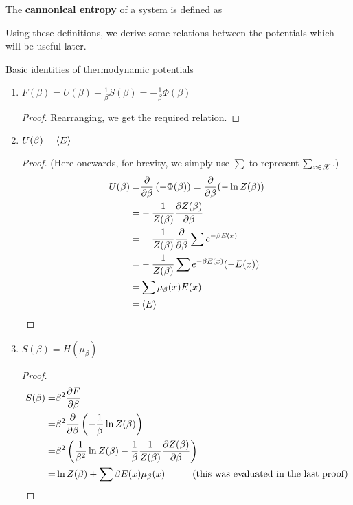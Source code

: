 \documentclass[letterpaper,english,10pt]{article}
\begin{document}
\begin{defn}
The \textbf{cannonical entropy} of a system is defined as 
\end{defn}
Using these definitions, we derive some relations between the potentials which will be useful later. 
\begin{lem} Basic identities of thermodynamic potentials
\begin{enumerate}
\item $F(\beta)=U(\beta)-\frac{1}{\beta}S(\beta)=-\frac{1}{\beta} \Phi(\beta)$
\begin{proof}
Rearranging, we get the required relation.
\end{proof}
\item $U(\beta)=\left\langle E \right\rangle$ 
\begin{proof}
(Here onewards, for brevity, we simply use $\sum$ to represent $\sum_{x \in \mathscr{X}}$.)
\begin{align*}
U(\beta)=&\frac{\partial}{\partial \beta}\left(-\Phi(\beta) \right)=\frac{\partial}{\partial \beta}(- \ln Z(\beta)) \\
=&-\frac{1}{Z(\beta)} \frac{\partial Z(\beta)}{\partial \beta}\\
=&-\frac{1}{Z(\beta)} \frac{\partial}{\partial \beta} \sum e^{-\beta E(x)}\\
=&-\frac{1}{Z(\beta)} \sum e^{-\beta E(x)} (-E(x))\\
=&\sum \mu_{\beta}(x) E(x)\\
=&\left\langle E \right\rangle
\end{align*}
\end{proof}
\item $S(\beta)=H(\mu_\beta)$
\begin{proof}
\begin{align*}
S(\beta)=&\beta^2 \frac{\partial F}{\partial \beta}\\
=&\beta^2 \frac{\partial }{\partial \beta} \left(-\frac{1}{\beta} \ln Z(\beta) \right)\\
=& \beta^2 \left( \frac{1}{\beta^2} \ln Z(\beta) - \frac{1}{\beta }\frac{1}{Z(\beta)}\frac{\partial Z(\beta)}{\partial \beta} \right) \\
=& \ln Z(\beta) +\sum \beta E(x) \mu_\beta (x) \hspace{10mm} \text{(this was evaluated in the last proof)} \\

\end{align*}
\end{proof}
\end{enumerate}
\end{lem}
\end{document}
